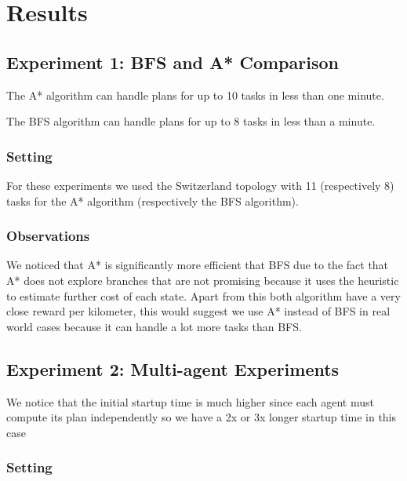 \documentclass[11pt]{article}
\begin{document}
\section{Results}

\subsection{Experiment 1: BFS and A* Comparison}
The A* algorithm can handle plans for up to 10 tasks in less than one
minute.

The BFS algorithm can handle plans for up to 8 tasks in less than a
minute.

\subsubsection{Setting}
For these experiments we used the Switzerland topology with 11
(respectively 8) tasks for the A* algorithm (respectively the BFS
algorithm).

\subsubsection{Observations}

We noticed that A* is significantly more efficient that BFS due to the
fact that A* does not explore branches that are not promising because
it uses the heuristic to estimate further cost of each state. Apart
from this both algorithm have a very close reward per kilometer, this
would suggest we use A* instead of BFS in real world cases because it
can handle a lot more tasks than BFS.

\subsection{Experiment 2: Multi-agent Experiments}

We notice that the initial startup time is much higher since each
agent must compute its plan independently so we have a 2x or 3x longer
startup time in this case

\subsubsection{Setting}
\end{document}
